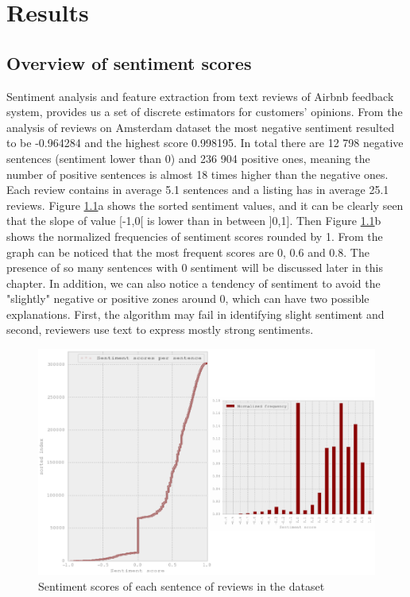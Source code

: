 %
%
\let\textcircled=\pgftextcircled
\chapter{Results}
\label{chap:res}
\section{Overview of sentiment scores}
Sentiment analysis and feature extraction from text reviews of Airbnb feedback system, provides us a set of discrete estimators for customers' opinions. From the analysis of reviews on Amsterdam dataset the most negative sentiment resulted to be -0.964284 and the highest score 0.998195. In total there are 12 798 negative sentences (sentiment lower than 0) and 236 904 positive ones, meaning the number of positive sentences is almost 18 times higher than the negative ones. Each review contains in average 5.1 sentences and a listing has in average 25.1 reviews. Figure \ref{fig:sent}a shows the sorted sentiment values, and it can be clearly seen that the slope of value [-1,0[ is lower than in between ]0,1]. Then Figure \ref{fig:sent}b shows the normalized frequencies of sentiment scores rounded by 1. From the graph can be noticed that the most frequent scores are 0, 0.6 and 0.8. The presence of so many sentences with 0 sentiment will be discussed later in this chapter. In addition, we can also notice a tendency of sentiment to avoid the "slightly" negative or positive zones around 0, which can have two possible explanations. First, the algorithm may fail in identifying slight sentiment and second, reviewers use text to express mostly strong sentiments.
\begin{figure}[h!]
\centering
	\includegraphics[height=0.35\textheight]{normalized_sentiment_freq}
%
%
	\caption{Sentiment scores of each sentence of reviews in the dataset}
	\label{fig:sent}
\end{figure}

